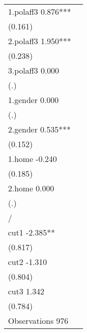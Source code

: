 \begin{table}[H]
\begin{tabular}{l*{1}{c}}
1.polaff3                 0.876***\\
                        (0.161)   \\
2.polaff3                 1.950***\\
                        (0.238)   \\
3.polaff3                 0.000   \\
                            (.)   \\
1.gender                  0.000   \\
                            (.)   \\
2.gender                  0.535***\\
                        (0.152)   \\
1.home                   -0.240   \\
                        (0.185)   \\
2.home                    0.000   \\
                            (.)   \\
\midrule
/                                 \\
cut1                     -2.385** \\
                        (0.817)   \\
cut2                     -1.310   \\
                        (0.804)   \\
cut3                      1.342   \\
                        (0.784)   \\
\midrule
Observations                976   \\
\bottomrule\end{tabular}\end{table}
